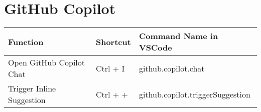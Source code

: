 \documentclass{article}
\begin{document}
\section*{GitHub Copilot}
\begin{longtable}{|p{6cm}|p{3cm}|p{7cm}|}
\hline
\rowcolor{white}
\textbf{Function} & \textbf{Shortcut} & \textbf{Command Name in VSCode} \\
\hline
Open GitHub Copilot Chat & Ctrl + I & github.copilot.chat \\
Trigger Inline Suggestion & Ctrl + + & github.copilot.triggerSuggestion \\
\hline
\end{longtable}
\end{document}
